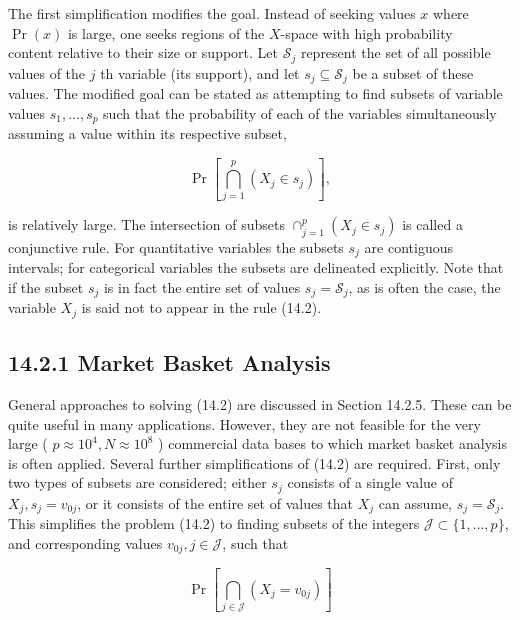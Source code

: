 \documentclass[10pt]{article}
\begin{document}
The first simplification modifies the goal. Instead of seeking values $x$ where $\operatorname{Pr}(x)$ is large, one seeks regions of the $X$-space with high probability\\
content relative to their size or support. Let $\mathcal{S}_{j}$ represent the set of all possible values of the $j$ th variable (its support), and let $s_{j} \subseteq \mathcal{S}_{j}$ be a subset of these values. The modified goal can be stated as attempting to find subsets of variable values $s_{1}, \ldots, s_{p}$ such that the probability of each of the variables simultaneously assuming a value within its respective subset,


\begin{equation*}
\operatorname{Pr}\left[\bigcap_{j=1}^{p}\left(X_{j} \in s_{j}\right)\right], \tag{14.2}
\end{equation*}


is relatively large. The intersection of subsets $\cap_{j=1}^{p}\left(X_{j} \in s_{j}\right)$ is called a conjunctive rule. For quantitative variables the subsets $s_{j}$ are contiguous intervals; for categorical variables the subsets are delineated explicitly. Note that if the subset $s_{j}$ is in fact the entire set of values $s_{j}=\mathcal{S}_{j}$, as is often the case, the variable $X_{j}$ is said not to appear in the rule (14.2).

\subsection*{14.2.1 Market Basket Analysis}
General approaches to solving (14.2) are discussed in Section 14.2.5. These can be quite useful in many applications. However, they are not feasible for the very large ( $p \approx 10^{4}, N \approx 10^{8}$ ) commercial data bases to which market basket analysis is often applied. Several further simplifications of (14.2) are required. First, only two types of subsets are considered; either $s_{j}$ consists of a single value of $X_{j}, s_{j}=v_{0 j}$, or it consists of the entire set of values that $X_{j}$ can assume, $s_{j}=\mathcal{S}_{j}$. This simplifies the problem (14.2) to finding subsets of the integers $\mathcal{J} \subset\{1, \ldots, p\}$, and corresponding values $v_{0 j}, j \in \mathcal{J}$, such that


\begin{equation*}
\operatorname{Pr}\left[\bigcap_{j \in \mathcal{J}}\left(X_{j}=v_{0 j}\right)\right] \tag{14.3}
\end{equation*}
\end{document}
